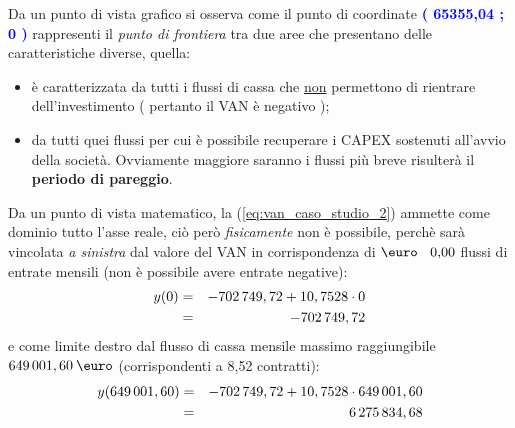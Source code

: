 Da un punto di vista grafico si osserva come il punto di coordinate \textbf{\textcolor{blue}{( 65355,04 ; 0 )}} rappresenti il \textit{punto di frontiera} tra due aree che presentano delle caratteristiche diverse, quella:
\begin{itemize}
\item \textbf{\color{red}{rossa}} è caratterizzata da tutti i flussi di cassa che \underline{non} permettono di rientrare dell'investimento ( pertanto il VAN è negativo );
\item \textbf{\color{green}{verde}} da tutti quei flussi per cui è possibile recuperare i CAPEX sostenuti all'avvio della società. Ovviamente maggiore saranno i flussi più breve risulterà il \textbf{periodo di pareggio}.
\end{itemize}


\newline
Da un punto di vista matematico, la (\ref{eq:van_caso_studio_2}) ammette come dominio tutto l'asse reale, ciò però \textit{fisicamente} non è possibile, perchè sarà vincolata \textit{a sinistra} dal valore del VAN in corrispondenza di $\mbox{\euro \: 0,00}$ flussi di entrate mensili (non è possibile avere entrate negative):  
	\begin{eqnarray}
	\label{eq:limite_sinistro}
 		y(0) & = & -702\thinspace 749,72 + 10,7528 \cdot 0 \nonumber \\
 								& = & -702\thinspace 749,72
	\end{eqnarray}
e come limite destro dal flusso di cassa mensile massimo raggiungibile $649\thinspace 001,60 \: \mbox{\euro}$ (corrispondenti a 8,52 contratti):
	\begin{eqnarray}
	\label{eq:limite_superiore}
 		y(649\thinspace 001,60) & = & -702\thinspace 749,72 + 10,7528 \cdot 649\thinspace 001,60 \nonumber \\
 								& = & 6\thinspace 275\thinspace 834,68
	\end{eqnarray}
	
